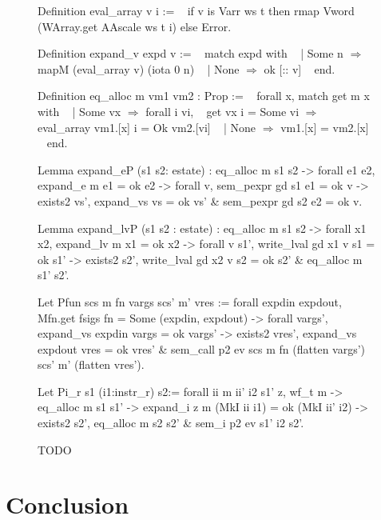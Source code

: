 \documentclass{article}
\begin{document}
\begin{figure}[tp] %
\obeylines\obeyspaces\ttfamily%
Definition eval\_array v i :=
~ if v is Varr ws t then rmap Vword (WArray.get AAscale ws t i) else Error.

Definition expand\_v expd v :=
~ match expd with
~ | Some n \(\Rightarrow\) mapM (eval\_array v) (iota 0 n)
~ | None   \(\Rightarrow\) ok [:: v]
~ end.

Definition eq\_alloc m vm1 vm2 : Prop :=
~ forall x, match get m x with
~ | Some vx \(\Rightarrow\) forall i vi,
~   get vx i = Some vi \(\Longrightarrow\) eval\_array vm1.[x] i = Ok vm2.[vi]
~ | None \(\Rightarrow\) vm1.[x] = vm2.[x]
~ end.

Lemma expand_eP (s1 s2: estate) :
  eq_alloc m s1 s2 ->
  forall e1 e2, expand_e m e1 = ok e2 -> 
  forall v, sem_pexpr gd s1 e1 = ok v ->
    exists2 vs', expand_vs vs = ok vs' &
            sem_pexpr gd s2 e2 = ok v.

Lemma expand_lvP (s1 s2 : estate) :
  eq_alloc m s1 s2 ->
  forall x1 x2, expand_lv m x1 = ok x2 ->
  forall v s1',
    write_lval gd x1 v s1 = ok s1' ->
    exists2 s2', write_lval gd x2 v s2 = ok s2' & eq_alloc m s1' s2'.

Let Pfun scs m fn vargs scs' m' vres :=
  forall expdin expdout, Mfn.get fsigs fn = Some (expdin, expdout) ->
  forall vargs', expand_vs expdin vargs = ok vargs' ->
  exists2 vres', expand_vs expdout vres = ok vres' &
    sem_call p2 ev scs m fn (flatten vargs') scs' m' (flatten vres').

Let Pi_r s1 (i1:instr_r) s2:=
  forall ii m ii' i2 s1' z,
	  wf_t m -> eq_alloc m s1 s1' ->
		  expand_i z m (MkI ii i1) = ok (MkI ii' i2) ->
			exists2 s2', eq_alloc m s2 s2' & sem_i p2 ev s1' i2 s2'.
\normalfont%
\caption{TODO}
\end{figure}



\section{}

\section{Conclusion}
\end{document}
